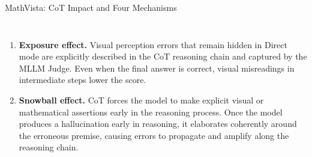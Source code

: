 \documentclass[9pt,aspectratio=169]{beamer}
\begin{document}
\begin{frame}{MathVista: CoT Impact and Four Mechanisms}
\begin{columns}[T,onlytextwidth]
{\begin{enumerate}
        \item \textbf{Exposure effect.}
          Visual perception errors that remain hidden in Direct mode
          are explicitly described in the CoT reasoning chain and
          captured by the MLLM Judge.
          Even when the final answer is correct,
          visual misreadings in intermediate steps lower the score.

        \item \textbf{Snowball effect.}
          CoT forces the model to make explicit visual or mathematical
          assertions early in the reasoning process.
          Once the model produces a hallucination early in reasoning,
          it elaborates coherently around the erroneous premise,
          causing errors to propagate and amplify along the reasoning chain.
      \end{enumerate}}
  \end{columns}
\end{frame}
\end{document}
